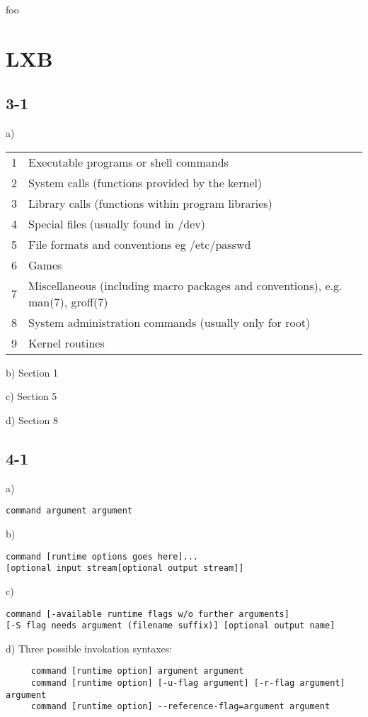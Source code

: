 foo
\section{LXB}
\subsection{3-1}
a)

\begin{tabular}{ll}
1&   Executable programs or shell commands\\
2&   System calls (functions provided by the kernel)\\
3&   Library calls (functions within program libraries)\\
4&   Special files (usually found in /dev)\\
5&   File formats and conventions eg /etc/passwd\\
6&   Games\\
7&   Miscellaneous (including macro packages and conventions), e.g. man(7), groff(7)\\
8&   System administration commands (usually only for root)\\
9&   Kernel routines
\end{tabular}

b) Section 1

c) Section 5

d) Section 8

\subsection{4-1}
a) \begin{verbatim}command argument argument\end{verbatim}

b) \begin{verbatim}command [runtime options goes here]...
[optional input stream[optional output stream]]\end{verbatim}

c) \begin{verbatim}
command [-available runtime flags w/o further arguments]
[-S flag needs argument (filename suffix)] [optional output name]
\end{verbatim}


d) Three possible invokation syntaxes:
\begin{verbatim}
     command [runtime option] argument argument
     command [runtime option] [-u-flag argument] [-r-flag argument] argument
     command [runtime option] --reference-flag=argument argument
\end{verbatim}

